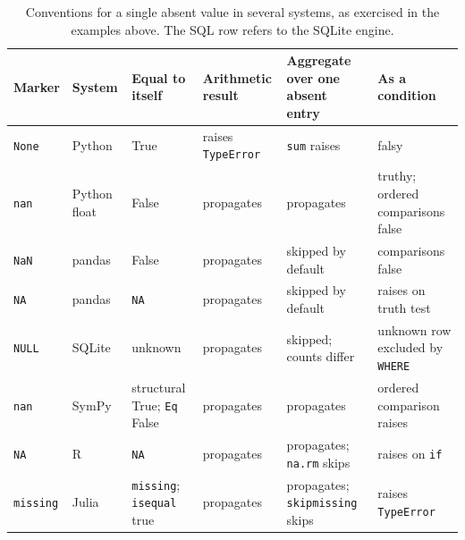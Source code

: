 \documentclass[11pt]{article}
\theoremstyle{remark}
\begin{document}
\begin{table}[h]
\centering
\small
\setlength{\tabcolsep}{3pt}
\renewcommand{\arraystretch}{1.25}
\begin{tabular}{p{1.9cm}p{1.9cm}p{1.9cm}p{2.2cm}p{2.3cm}p{2.4cm}}
\hline
Marker & System & Equal to itself & Arithmetic result & Aggregate over one absent entry & As a condition \\
\hline
\texttt{None} & Python & True & raises \texttt{TypeError} & \texttt{sum} raises & falsy \\
\texttt{nan} & Python float & False & propagates & propagates & truthy; ordered comparisons false \\
\texttt{NaN} & pandas & False & propagates & skipped by default & comparisons false \\
\texttt{NA} & pandas & \texttt{NA} & propagates & skipped by default & raises on truth test \\
\texttt{NULL} & SQLite & unknown & propagates & skipped; counts differ & unknown row excluded by \texttt{WHERE} \\
\texttt{nan} & SymPy & structural True; \texttt{Eq} False & propagates & propagates & ordered comparison raises \\
\texttt{NA} & R & \texttt{NA} & propagates & propagates; \texttt{na.rm} skips & raises on \texttt{if} \\
\texttt{missing} & Julia & \texttt{missing}; \texttt{isequal} true & propagates & propagates; \texttt{skipmissing} skips & raises \texttt{TypeError} \\
\hline
\end{tabular}
\caption{Conventions for a single absent value in several systems, as exercised in the examples above. The SQL row refers to the SQLite engine.}
\end{table}
\end{document}
